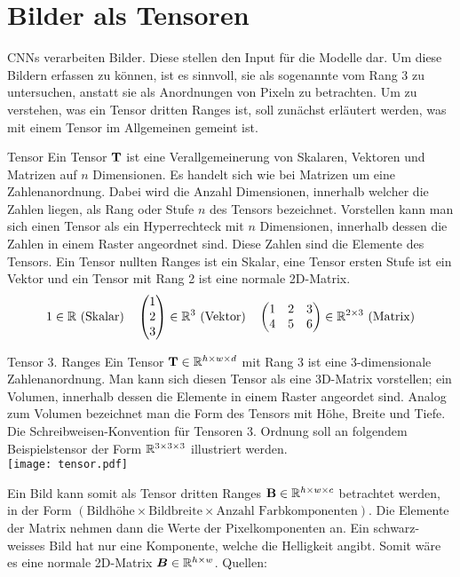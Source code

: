 \section{Bilder als Tensoren}\label{sec:tensor}
CNNs verarbeiten Bilder. Diese stellen den Input für die Modelle dar.
Um diese Bildern erfassen zu können, ist es sinnvoll, sie als sogenannte
 vom Rang 3 zu untersuchen, anstatt sie als Anordnungen von
Pixeln zu betrachten. Um zu verstehen, was ein Tensor dritten Ranges ist,
soll zunächst erläutert werden, was mit einem Tensor im Allgemeinen gemeint ist.

\begin{defbox}{Tensor}
  Ein Tensor $\mathbf{T}$ ist eine Verallgemeinerung von Skalaren, Vektoren und Matrizen auf
  $n$ Dimensionen. Es handelt sich wie bei Matrizen um
  eine Zahlenanordnung. Dabei wird die Anzahl Dimensionen, innerhalb welcher die
  Zahlen liegen, als Rang oder Stufe $n$ des Tensors bezeichnet. Vorstellen kann man sich einen Tensor
  als ein Hyperrechteck mit $n$ Dimensionen, innerhalb dessen die Zahlen in
  einem Raster angeordnet sind. Diese Zahlen sind die Elemente des Tensors.
  Ein Tensor nullten Ranges ist ein Skalar, eine Tensor ersten Stufe ist ein
  Vektor und ein Tensor mit Rang 2 ist eine normale 2D-Matrix.
  \begin{gather*}
    1 \in \mathbb{R} \text{ (Skalar)} \quad \begin{pmatrix} 1 \\ 2 \\ 3 \end{pmatrix}
    \in \mathbb{R}^3 \text{ (Vektor)} \quad
    \begin{pmatrix}
      1 & 2 & 3 \\
      4 & 5 & 6 \\
    \end{pmatrix} \in \mathbb{R}^{2 \times 3} \text{ (Matrix)}
  \end{gather*}
\end{defbox}

\begin{defbox}{Tensor 3. Ranges}
  Ein Tensor $\mathbf{T} \in \mathbb{R}^{h \times w \times d}$ mit Rang 3 ist eine 3-dimensionale Zahlenanordnung. Man kann sich
  diesen Tensor als eine 3D-Matrix vorstellen; ein Volumen, innerhalb
  dessen die Elemente in einem Raster angeordet sind.
  Analog zum Volumen bezeichnet man die Form des Tensors mit Höhe, Breite und
  Tiefe.
  \para{}
  Die Schreibweisen-Konvention für Tensoren 3. Ordnung soll an folgendem
  Beispielstensor der Form $\mathbb{R}^{3 \times 3 \times 3}$ illustriert werden. \\
  \texttt{[image: tensor.pdf]}

\end{defbox}
\para{}
Ein Bild kann somit als Tensor dritten Ranges $\mathbf{B} \in \mathbb{R}^{h
  \times w \times c}$ betrachtet werden, in der Form $(\text{Bildhöhe} \times \text{Bildbreite}
\times \text{Anzahl Farbkomponenten})$.
Die Elemente der Matrix nehmen dann die Werte der Pixelkomponenten an.
Ein schwarz-weisses Bild hat nur eine Komponente, welche die Helligkeit angibt.
Somit wäre es eine normale 2D-Matrix $\bm{B} \in \mathbb{R}^{h \times w}$.
\para{}
Quellen: \cite{deeplearning.ai:cnn} \cite{wiki:tensor}

